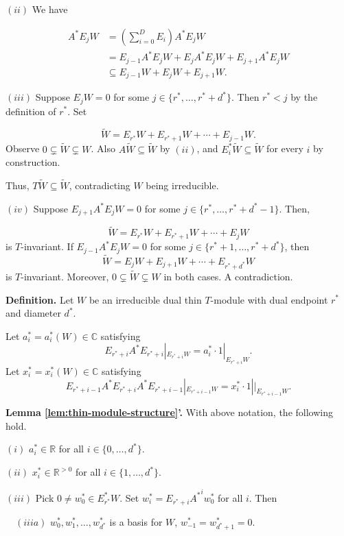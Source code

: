 \documentclass[
]{book}
\theoremstyle{definition}
\theoremstyle{definition}
\theoremstyle{definition}
\theoremstyle{definition}
\theoremstyle{remark}
\begin{document}
\((ii)\) We have

\begin{align}
A^*E_jW & = \left(\sum_{i=0}^{D}E_i\right)A^*E_jW\\
& = E_{j-1}A^*E_jW + E_jA^*E_jW + E_{j+1}A^*E_jW\\
& \subseteq E_{j-1}W + E_jW + E_{j+1}W.
\end{align}

\((iii)\) Suppose \(E_jW = 0\) for some \(j\in \{r^*, \ldots, r^*+d^*\}\). Then \(r^* < j\) by the definition of \(r^*\). Set

\[\widetilde{W} = E_{r^*}W + E_{r^*+1}W + \cdots + E_{j-1}W.\]
Observe \(0\subsetneq \widetilde{W} \subsetneq W\).
Also \(A\widetilde{W} \subseteq \widetilde{W}\) by \((ii)\), and \(E_i^*\widetilde{W} \subseteq \widetilde{W}\) for every \(i\) by construction.

Thus, \(T\widetilde{W} \subseteq \widetilde{W}\), contradicting \(W\) being irreducible.

\((iv)\) Suppose \(E_{j+1}A^*E_jW = 0\) for some \(j\in \{r^*, \ldots, r^*+d^*-1\}\). Then,

\[\widetilde{W} = E_{r^*}W + E_{r^*+1}W + \cdots + E_{j}W\]
is \(T\)-invariant. If \(E_{j-1}A^*E_jW = 0\) for some \(j\in \{r^*+1, \ldots, r^*+d^*\}\), then
\[\widetilde{W} = E_{j}W + E_{j+1}W + \cdots + E_{r^*+d^*}W\]
is \(T\)-invariant. Moreover, \(0 \subsetneq \widetilde{W} \subsetneq W\) in both cases. A contradiction.

\hfill\break

\textbf{Definition.} Let \(W\) be an irreducible dual thin \(T\)-module with dual endpoint \(r^*\) and diameter \(d^*\).

Let \(a^*_i = a^*_i(W)\in\mathbb{C}\) satisfying
\[E_{r^*+i}A^*E_{r^*+i}|_{E_{r^*+i}W} = a^*_i\cdot 1|_{E_{r^*+i}W}.\]
Let \(x^*_i = x^*_i(W)\in \mathbb{C}\) satisfying
\[E_{r^*+i-1}A^*E_{r^*+i}A^*E_{r^*+i-1}|_{E_{r^*+i-1}W} = x^*_i\cdot 1||_{E_{r^*+i-1}W}.\]

\textbf{Lemma \ref{lem:thin-module-structure}'.}
With above notation, the following hold.

\((i)\) \(a^*_i\in \mathbb{R}\) for all \(i\in \{0, \ldots, d^*\}\).

\((ii)\) \(x^*_i\in \mathbb{R}^{>0}\) for all \(i\in \{1, \ldots, d^*\}\).

\((iii)\) Pick \(0\neq w^*_0\in E^*_{r^*}W\). Set \(w^*_i = E_{r^*+i}{A^*}^iw^*_0\) for all \(i\). Then

\(\quad (iiia)\) \(w^*_0, w^*_1, \ldots, w^*_{d^*}\) is a basis for \(W\), \(w^*_{-1} = w^*_{d^*+1} = 0\).
\end{document}
